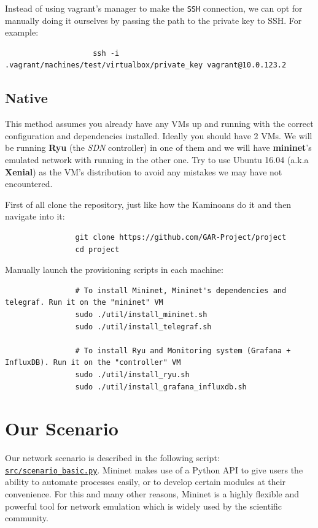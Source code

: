 \documentclass[12pt]{report}
\begin{document}
				Instead of using vagrant's manager to make the \texttt{SSH} connection, we can opt for manually doing it ourselves by passing the path to the private key to SSH. For example:

				\begin{verbatim}
					ssh -i .vagrant/machines/test/virtualbox/private_key vagrant@10.0.123.2
				\end{verbatim}

		\subsection{Native}
			This method assumes you already have any VMs up and running with the correct configuration and dependencies installed. Ideally you should have 2 VMs. We will be running \textbf{Ryu} (the \textit{SDN} controller) in one of them and we will have \textbf{mininet}'s emulated network with running in the other one. Try to use Ubuntu 16.04 (a.k.a \textbf{Xenial}) as the VM's distribution to avoid any mistakes we may have not encountered.

			First of all clone the repository, just like how the Kaminoans do it and then navigate into it:

			\begin{verbatim}
				git clone https://github.com/GAR-Project/project
				cd project
			\end{verbatim}

			Manually launch the provisioning scripts in each machine:

			\begin{verbatim}
				# To install Mininet, Mininet's dependencies and telegraf. Run it on the "mininet" VM
				sudo ./util/install_mininet.sh
				sudo ./util/install_telegraf.sh

				# To install Ryu and Monitoring system (Grafana + InfluxDB). Run it on the "controller" VM
				sudo ./util/install_ryu.sh
				sudo ./util/install_grafana_influxdb.sh
			\end{verbatim}

	\section{Our Scenario}
		Our network scenario is described in the following script: \href{https://github.com/GAR-Project/project/blob/master/src/scenario_basic.py}{\texttt{src/scenario_basic.py}}. Mininet makes use of a Python API to give users the ability to automate processes easily, or to develop certain modules at their convenience. For this and many other reasons, Mininet is a highly flexible and powerful tool for network emulation which is widely used by the scientific community.
\end{document}
